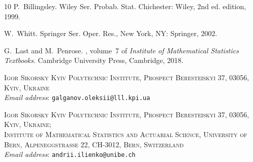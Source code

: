 \documentclass[11pt]{article}
\newcommand{\1}[1][]{
	\ifx&#1&\mathds{1}
	\else\mathds{1}\left\{#1\right\}\fi}
\theoremstyle{definition}
\theoremstyle{remark}
\numberwithin{equation}{section}
\begin{document}
\begin{thebibliography}{10}
		P.~Billingsley.
		\newblock Wiley Ser. Probab. Stat. Chichester: Wiley, 2nd ed. edition, 1999.

		W.~Whitt.
		\newblock Springer Ser. Oper. Res., New York, NY: Springer, 2002.

		G.~Last and M.~Penrose.
		, volume~7 of {\em Institute
			of Mathematical Statistics Textbooks}.
		\newblock Cambridge University Press, Cambridge, 2018.
		
	\end{thebibliography}
	
	\vspace{10pt}
	
	\noindent
	\textsc{Igor Sikorsky Kyiv Polytechnic Institute, Prospect Beresteiskyi 37, 03056, Kyiv, Ukraine} \\
	\textit{Email address}: \texttt{galganov.oleksii@lll.kpi.ua}
	
	\vspace{10pt}
	
	\noindent
	\textsc{Igor Sikorsky Kyiv Polytechnic Institute, Prospect Beresteiskyi 37, 03056, Kyiv, Ukraine;} \\
	\textsc{Institute of Mathematical Statistics and Actuarial Science, University of Bern, Alpeneggstrasse 22, CH-3012, Bern, Switzerland} \\
	\textit{Email address}: \texttt{andrii.ilienko@unibe.ch}
		
\end{document}
